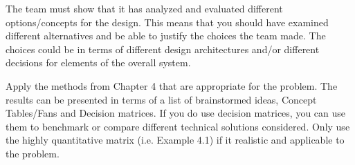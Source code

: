 \begin{enumerate}
\begin{onlysolution}
  The team must show that it has analyzed and evaluated different options/concepts for the 
  design. This means that you should have examined different alternatives and be able to 
  justify the choices the team made. The choices could be in terms of different design 
  architectures and/or different decisions for elements of the overall system.
  
  Apply the methods from Chapter 4 that are appropriate for the problem. The results can be 
  presented in terms of a list of brainstormed ideas, Concept Tables/Fans and Decision 
  matrices. If you do use decision matrices, you can use them to benchmark or compare different 
  technical solutions considered. Only use the highly quantitative matrix (i.e. Example 4.1) if 
  it realistic and applicable to the problem.
  \end{onlysolution}

\end{enumerate}

